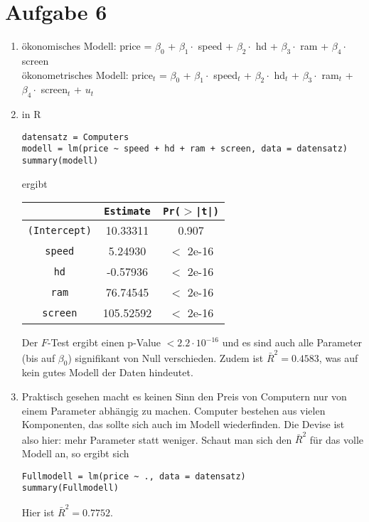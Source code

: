 \documentclass{article}
\begin{document}
	\section*{Aufgabe 6}
	\begin{enumerate}[label=(\alph*)]
		\item ökonomisches Modell: price = $\beta_0$ + $\beta_1\cdot$ speed + $\beta_2\cdot$ hd + $\beta_3\cdot$ ram + $\beta_4\cdot$ screen \\
		ökonometrisches Modell: price$_t$ = $\beta_0$ + $\beta_1\cdot$ speed$_t$ + $\beta_2\cdot$ hd$_t$ + $\beta_3\cdot$ ram$_t$ + $\beta_4\cdot$ screen$_t$ + $u_t$
		\item in R
		\begin{lstlisting}[style=R]
datensatz = Computers
modell = lm(price ~ speed + hd + ram + screen, data = datensatz)
summary(modell)
		\end{lstlisting}
		ergibt
		\begin{center}
			\begin{tabular}{c|c|c}
				& \texttt{Estimate} & \texttt{Pr($>$|t|)} \\
				\hline
				\texttt{(Intercept)} & 10.33311 & 0.907 \\
				\texttt{speed} & 5.24930 & $<$ 2e-16 \\
				\texttt{hd} & -0.57936 & $<$ 2e-16 \\
				\texttt{ram} & 76.74545 & $<$ 2e-16 \\
				\texttt{screen} & 105.52592 & $<$ 2e-16
			\end{tabular}
		\end{center}
		Der $F$-Test ergibt einen p-Value $<2.2\cdot 10^{-16}$ und es sind auch alle Parameter (bis auf $\beta_0$) signifikant von Null verschieden. Zudem ist $\bar{R}^2=0.4583$, was auf kein gutes Modell der Daten hindeutet.
		\item Praktisch gesehen macht es keinen Sinn den Preis von Computern nur von einem Parameter abhängig zu machen. Computer bestehen aus vielen Komponenten, das sollte sich auch im Modell wiederfinden. Die Devise ist also hier: mehr Parameter statt weniger. Schaut man sich den $\bar{R}^2$ für das volle Modell an, so ergibt sich
		\begin{lstlisting}[style=R]
Fullmodell = lm(price ~ ., data = datensatz)
summary(Fullmodell)
		\end{lstlisting}
		Hier ist $\bar{R}^2=0.7752$.
	\end{enumerate}
\end{document}

